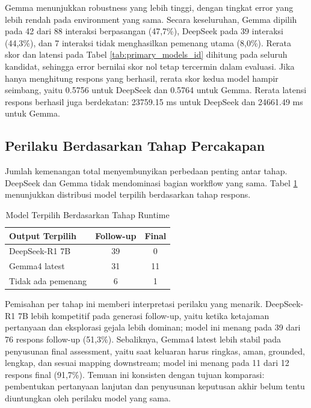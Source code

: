 \documentclass[conference]{IEEEtran}
\begin{document}
Gemma menunjukkan robustness yang lebih tinggi, dengan tingkat error yang lebih rendah pada environment yang sama. Secara keseluruhan, Gemma dipilih pada 42 dari 88 interaksi berpasangan (47,7\%), DeepSeek pada 39 interaksi (44,3\%), dan 7 interaksi tidak menghasilkan pemenang utama (8,0\%). Rerata skor dan latensi pada Tabel \ref{tab:primary_models_id} dihitung pada seluruh kandidat, sehingga error bernilai skor nol tetap tercermin dalam evaluasi. Jika hanya menghitung respons yang berhasil, rerata skor kedua model hampir seimbang, yaitu 0.5756 untuk DeepSeek dan 0.5764 untuk Gemma. Rerata latensi respons berhasil juga berdekatan: 23759.15 ms untuk DeepSeek dan 24661.49 ms untuk Gemma.

\subsection{Perilaku Berdasarkan Tahap Percakapan}
Jumlah kemenangan total menyembunyikan perbedaan penting antar tahap. DeepSeek dan Gemma tidak mendominasi bagian workflow yang sama. Tabel \ref{tab:stage_wins_id} menunjukkan distribusi model terpilih berdasarkan tahap respons.

\begin{table}[t]
\caption{Model Terpilih Berdasarkan Tahap Runtime}
\label{tab:stage_wins_id}
\centering
\footnotesize
\begin{tabular}{|l|c|c|}
\hline
\textbf{Output Terpilih} & \textbf{Follow-up} & \textbf{Final} \\
\hline
DeepSeek-R1 7B & 39 & 0 \\
\hline
Gemma4 latest & 31 & 11 \\
\hline
Tidak ada pemenang & 6 & 1 \\
\hline
\end{tabular}
\end{table}

Pemisahan per tahap ini memberi interpretasi perilaku yang menarik. DeepSeek-R1 7B lebih kompetitif pada generasi follow-up, yaitu ketika ketajaman pertanyaan dan eksplorasi gejala lebih dominan; model ini menang pada 39 dari 76 respons follow-up (51,3\%). Sebaliknya, Gemma4 latest lebih stabil pada penyusunan final assessment, yaitu saat keluaran harus ringkas, aman, grounded, lengkap, dan sesuai mapping downstream; model ini menang pada 11 dari 12 respons final (91,7\%). Temuan ini konsisten dengan tujuan komparasi: pembentukan pertanyaan lanjutan dan penyusunan keputusan akhir belum tentu diuntungkan oleh perilaku model yang sama.
\end{document}
